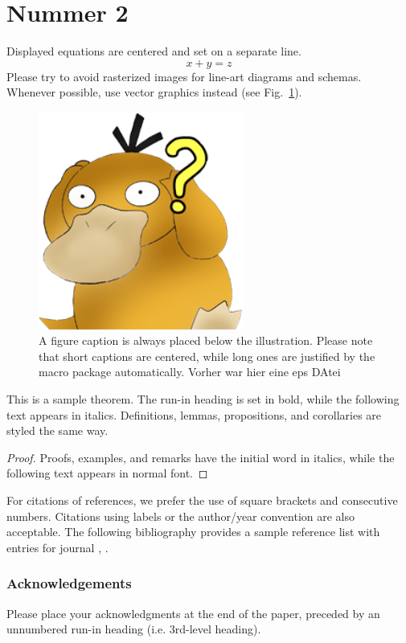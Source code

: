 \section{Nummer 2}
\noindent Displayed equations are centered and set on a separate
line.
\begin{equation}
    x + y = z
\end{equation}
Please try to avoid rasterized images for line-art diagrams and
schemas. Whenever possible, use vector graphics instead (see
Fig.~\ref{fig1}).

\begin{figure}
    \includegraphics[width=0.6\textwidth]{Bilder/enton.png}
    \caption{A figure caption is always placed below the illustration.
        Please note that short captions are centered, while long ones are
        justified by the macro package automatically. Vorher war hier eine eps DAtei} \label{fig1}
\end{figure}

\begin{theorem}
    This is a sample theorem. The run-in heading is set in bold, while
    the following text appears in italics. Definitions, lemmas,
    propositions, and corollaries are styled the same way.
\end{theorem}
%
%
\begin{proof}
    Proofs, examples, and remarks have the initial word in italics,
    while the following text appears in normal font.
\end{proof}
For citations of references, we prefer the use of square brackets
and consecutive numbers. Citations using labels or the author/year
convention are also acceptable. The following bibliography provides
a sample reference list with entries for journal
\cite{BenStruss.27.02.209},
\cite{AnnekeWinter.,bow}.

\subsubsection{Acknowledgements} Please place your acknowledgments at
the end of the paper, preceded by an unnumbered run-in heading (i.e.
3rd-level heading).